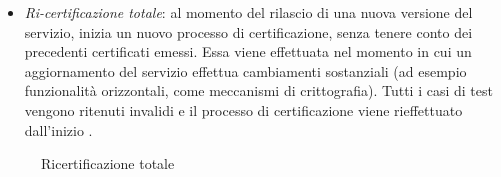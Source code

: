 \documentclass[../main.tex]{subfiles}
\begin{document}
\begin{itemize}
\item \textit{Ri-certificazione totale}: al momento del rilascio di una nuova versione del servizio, inizia un nuovo processo di certificazione, senza tenere conto dei precedenti certificati emessi.
Essa viene effettuata nel momento in cui un aggiornamento del servizio effettua cambiamenti sostanziali (ad esempio funzionalità orizzontali, come meccanismi di crittografia). Tutti i casi di test vengono ritenuti invalidi e il processo di certificazione viene rieffettuato dall'inizio \cite{CertEvolutiva}.
\end{itemize}

\begin{figure}[H]
   \centering
   \caption{Ricertificazione totale \cite{CertEvolutiva}}\label{fig:FullRecert}
\end{figure}
\vfill
\newpage




\end{document}

